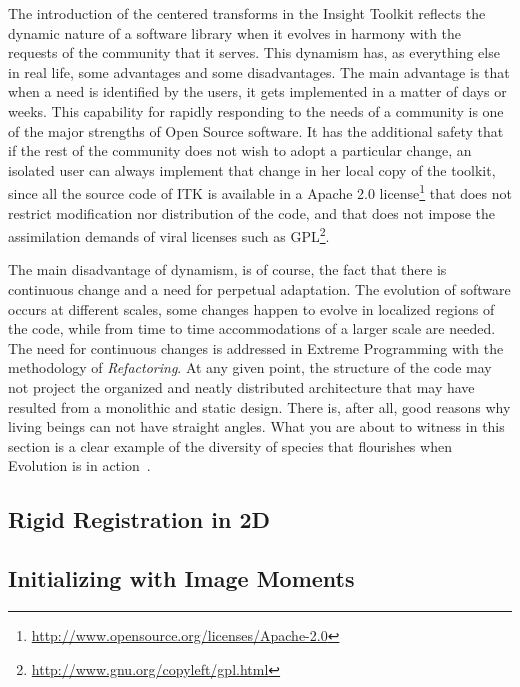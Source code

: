 The introduction of the centered transforms in the Insight Toolkit reflects the
dynamic nature of a software library when it evolves in harmony with the
requests of the community that it serves. This dynamism has, as everything else
in real life, some advantages and some disadvantages. The main advantage is that
when a need is identified by the users, it gets implemented in a matter of days
or weeks.  This capability for rapidly responding to the needs of a community
is one of the major strengths of Open Source software. It has the additional
safety that if the rest of the community does not wish to adopt a particular
change, an isolated user can always implement that change in her local copy of
the toolkit, since all the source code of ITK is available in a Apache 2.0
license\footnote{\url{http://www.opensource.org/licenses/Apache-2.0}} that
does not restrict modification nor distribution of the code, and that does not
impose the assimilation demands of viral licenses such as
GPL\footnote{\url{http://www.gnu.org/copyleft/gpl.html}}.

The main disadvantage of dynamism, is of course, the fact that there is
continuous change and a need for perpetual adaptation. The evolution of
software occurs at different scales, some changes happen to evolve in localized
regions of the code, while from time to time accommodations of a larger scale
are needed. The need for continuous changes is addressed in Extreme Programming
with the methodology of \emph{Refactoring}. At any given point, the structure
of the code may not project the organized and neatly distributed architecture
that may have resulted from a monolithic and static design. There is, after
all, good reasons why living beings can not have straight angles. What you are
about to witness in this section is a clear example of the diversity of species
that flourishes when Evolution is in action~\cite{Darwin1999}.


\subsection{Rigid Registration in 2D}
\label{sec:RigidRegistrationIn2D}
\ifitkFullVersion

\fi

\subsection{Initializing with Image Moments}
\label{sec:InitializingRegistrationWithMoments}
\ifitkFullVersion

\fi



